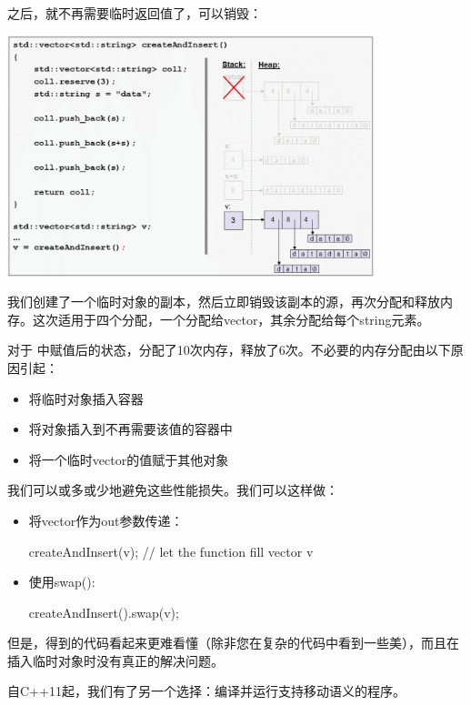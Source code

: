 \begin{itemize}
\begin{center}
	\end{center}
	之后，就不再需要临时返回值了，可以销毁：
\begin{center}
		\includegraphics[width=0.8\textwidth]{part1/ch1/images/9}
	\end{center}
	我们创建了一个临时对象的副本，然后立即销毁该副本的源，再次分配和释放内存。这次适用于四个分配，一个分配给vector，其余分配给每个string元素。
\end{itemize}

对于  中赋值后的状态，分配了10次内存，释放了6次。不必要的内存分配由以下原因引起：

\begin{itemize}
	\item 将临时对象插入容器
	\item 将对象插入到不再需要该值的容器中
	\item 将一个临时vector的值赋于其他对象
\end{itemize}

我们可以或多或少地避免这些性能损失。我们可以这样做：

\begin{itemize}
	\item 将vector作为out参数传递：
\begin{cppcode}
createAndInsert(v); // let the function fill vector v
\end{cppcode}
	\item 使用swap():
\begin{cppcode}
createAndInsert().swap(v);
\end{cppcode}
\end{itemize}

但是，得到的代码看起来更难看懂（除非您在复杂的代码中看到一些美），而且在插入临时对象时没有真正的解决问题。

自C++11起，我们有了另一个选择：编译并运行支持移动语义的程序。

